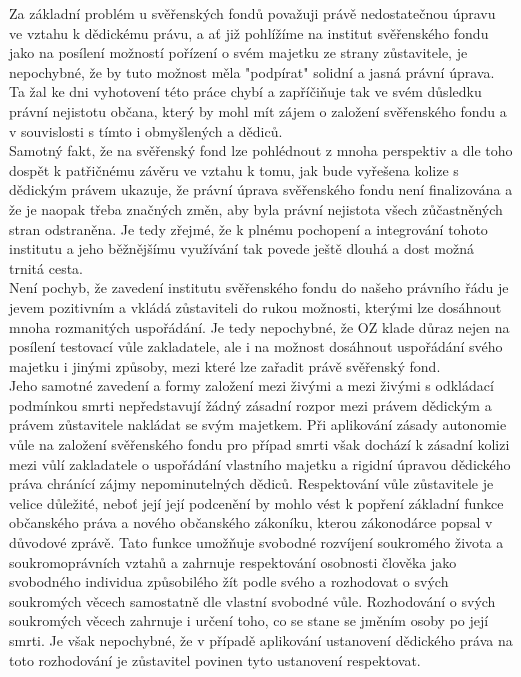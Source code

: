 \documentclass{article}
\begin{document}
Za základní problém u svěřenských fondů považuji právě nedostatečnou úpravu ve vztahu k dědickému právu, a ať již pohlížíme na institut svěřenského fondu jako na posílení možností pořízení o svém majetku ze strany zůstavitele, je nepochybné, že by tuto možnost měla "podpírat" solidní a jasná právní úprava. Ta žal ke dni vyhotovení této práce chybí a zapříčiňuje tak ve svém důsledku právní nejistotu občana, který by mohl mít zájem o založení svěřenského fondu a v souvislosti s tímto i obmyšlených a dědiců.\\

Samotný fakt, že na svěřenský fond lze pohlédnout z mnoha perspektiv a dle toho dospět k patřičnému závěru ve vztahu k tomu, jak bude vyřešena kolize s dědickým právem ukazuje, že právní úprava svěřenského fondu není finalizována a že je naopak třeba značných změn, aby byla právní nejistota všech zůčastněných stran odstraněna. Je tedy zřejmé, že k plnému pochopení a integrování tohoto institutu a jeho běžnějšímu využívání tak povede ještě dlouhá a dost možná trnitá cesta.\\

Není pochyb, že zavedení institutu svěřenského fondu do našeho právního řádu je jevem pozitivním a vkládá zůstaviteli do rukou možnosti, kterými lze dosáhnout mnoha rozmanitých uspořádání. Je tedy nepochybné, že OZ klade důraz nejen na posílení testovací vůle zakladatele, ale i na možnost dosáhnout uspořádání svého majetku i jinými způsoby, mezi které lze zařadit právě svěřenský fond.\\

Jeho samotné zavedení a formy založení mezi živými a mezi živými s odkládací podmínkou smrti nepředstavují žádný zásadní rozpor mezi právem dědickým a právem zůstavitele nakládat se svým majetkem. Při aplikování zásady autonomie vůle na založení svěřenského fondu pro případ smrti však dochází k zásadní kolizi mezi vůlí zakladatele o uspořádání vlastního majetku a rigidní úpravou dědického práva chránící zájmy nepominutelných dědiců. Respektování vůle zůstavitele je velice důležité, neboť její její podcenění by mohlo vést k popření základní funkce občanského práva a nového občanského zákoníku, kterou zákonodárce popsal v důvodové zprávě. Tato funkce umožňuje svobodné rozvíjení soukromého života a soukromoprávních vztahů a zahrnuje respektování osobnosti člověka jako svobodného individua způsobilého žít podle svého a rozhodovat o svých soukromých věcech samostatně dle vlastní svobodné vůle. Rozhodování o svých soukromých věcech zahrnuje i určení toho, co se stane se jměním osoby po její smrti. Je však nepochybné, že v případě aplikování ustanovení dědického práva na toto rozhodování je zůstavitel povinen tyto ustanovení respektovat.\\
\end{document}
